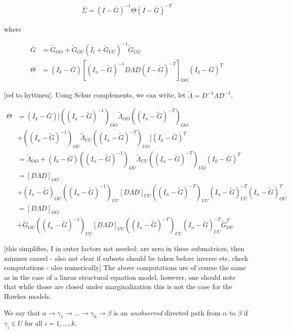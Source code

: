 \documentclass[accepted]{uai2021} %
\begin{document}
\begin{align}
\bar{\Sigma} = (I - \bar{G})^{-1}\Theta(I - \bar{G})^{-T}
\end{align}

where 

\begin{align*}
\bar{G} & = \tilde{G}_{OO} +  \tilde{G}_{OU}(I_l + 
\tilde{G}_{UU})^{-1}\tilde{G}_{UO} \\
\Theta & = (I_k-\bar{G})[(I_n - \tilde{G})^{-1}D\Lambda D(I - 
\tilde{G})^{-T}]_{OO}(I_k-\bar{G})^T
\end{align*}

[ref to hyttinen]. Using Schur complements, we can write, let $\tilde{\Lambda} 
= D^{-1}\Lambda D^{-1}$,

\begin{align*}
\Theta & = (I_k - \bar{G})[((I_n - 
\tilde{G})^{-1})_{OO}\tilde{\Lambda}_{OO}((I_n - \tilde{G})^{-T})_{OO} \\ & + 
((I_n 
- 
\tilde{G})^{-1})_{OU}\tilde{\Lambda}_{UU}((I_n - \tilde{G})^{-T})_{UO}](I_k - 
\bar{G})^T \\
& = \tilde{\Lambda}_{OO} + (I_k - \bar{G})((I_n 
- 
\tilde{G})^{-1})_{OU}\tilde{\Lambda}_{UU}((I_n - \tilde{G})^{-T})_{UO}(I_k - 
\bar{G})^T \\
& = [D\Lambda D]_{OO} \\ & + (I_n - \tilde{G})_{OU}((I_n - 
\tilde{G})^{-1})_{UU}[D\Lambda D]_{UU}((I_n - \tilde{G})^{-T})_{UU}(I_n - 
\tilde{G})_{UU}^{-T}(I_n - 
\tilde{G})_{OU}^T \\
& = [D\Lambda D]_{OO} \\ & + \tilde{G}_{OU}((I_n - 
\tilde{G})^{-1})_{UU}[D\Lambda D]_{UU}((I_n - \tilde{G})^{-T})_{UU}(I_n - 
\tilde{G})_{UU}^{-T} 
\tilde{G}_{OU}^T
\end{align*}

[this simplifies, I in outer factors not needed: are zero in these submatrices, 
then minuses cancel - also not clear if subsets should be taken before inverse 
etc, check computations - also numerically]
The above computations are of course the same as in the case of a linear 
structural equation model, however, one should note that while those are closed 
under marginalization this is not the case for the Hawkes models.

We say that $\alpha \rightarrow \gamma_1 \rightarrow \ldots \rightarrow 
\gamma_k \rightarrow \beta$ is an \emph{unobserved} directed path from $\alpha$ 
to $\beta$ if $\gamma_i \in U$ for all $i = 1,\ldots, k$. 
\end{document}
